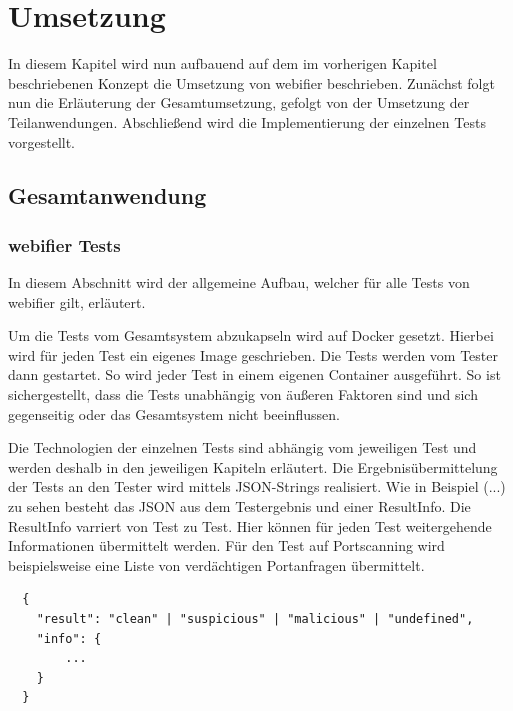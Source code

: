\chapter{Umsetzung}

In diesem Kapitel wird nun aufbauend auf dem im vorherigen Kapitel beschriebenen Konzept die Umsetzung von webifier beschrieben. Zunächst folgt nun die Erläuterung der Gesamtumsetzung, gefolgt von der Umsetzung der Teilanwendungen. Abschließend wird die Implementierung der einzelnen Tests vorgestellt.

\section{Gesamtanwendung}


\subsection{webifier Tests}
In diesem Abschnitt wird der allgemeine Aufbau, welcher für alle Tests von webifier gilt, erläutert.

Um die Tests vom Gesamtsystem abzukapseln wird auf Docker gesetzt. Hierbei wird für jeden Test ein eigenes Image geschrieben. Die Tests werden vom Tester dann gestartet. So wird jeder Test in einem eigenen Container ausgeführt. So ist sichergestellt, dass die Tests unabhängig von äußeren Faktoren sind und sich gegenseitig oder das Gesamtsystem nicht beeinflussen.

Die Technologien der einzelnen Tests sind abhängig vom jeweiligen Test und werden deshalb in den jeweiligen Kapiteln erläutert. Die Ergebnisübermittelung der Tests an den Tester wird mittels JSON-Strings realisiert. Wie in Beispiel (...) zu sehen besteht das JSON aus dem Testergebnis und einer ResultInfo. Die ResultInfo varriert von Test zu Test. Hier können für jeden Test weitergehende Informationen übermittelt werden. Für den Test auf Portscanning wird beispielsweise eine Liste von verdächtigen Portanfragen übermittelt.

\begin{scriptsize}
\begin{lstlisting}
  {
  	"result": "clean" | "suspicious" | "malicious" | "undefined",
  	"info": {
  		...
  	}
  }
\end{lstlisting}
\end{scriptsize}

